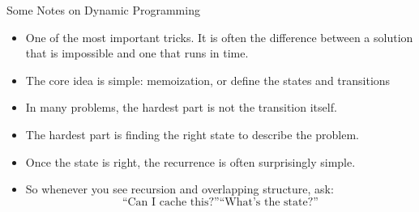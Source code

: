 \documentclass{beamer}
\begin{document}
\begin{frame}{Some Notes on Dynamic Programming}
    \begin{itemize}
        \item One of the most important tricks. It is often the difference between a solution that is impossible and one that runs in time.
        \item The core idea is simple: memoization, or define the states and transitions
        \item In many problems, the hardest part is not the transition itself.
        \item The hardest part is finding the right state to describe the problem.
        \item Once the state is right, the recurrence is often surprisingly simple.
        \item So whenever you see recursion and overlapping structure, ask:
        \[
            \text{``Can I cache this?''}
            \text{``What's the state?''}
        \]
    \end{itemize}
\end{frame}
\end{document}
